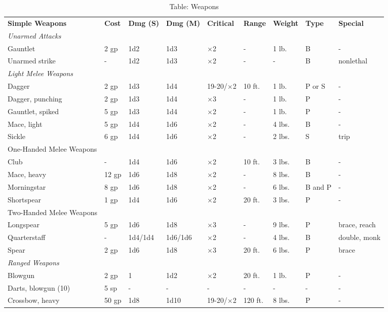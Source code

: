 \begin{table*}[]
\sffamily
\caption{Table: Weapons}
\begin{tabular}{lllllllll}
\textbf{Simple Weapons} & \textbf{Cost} & \textbf{Dmg (S)} & \textbf{Dmg (M)} & \textbf{Critical} & \textbf{Range} & \textbf{Weight} & \textbf{Type} & \textbf{Special}\\
\textit{Unarmed Attacks} \\
 Gauntlet & 2 gp & 1d2 & 1d3 & $\times$2 & - & 1 lb. & B & - \\
 Unarmed strike & - & 1d2 & 1d3 & $\times$2 & - & - & B & nonlethal \\
\textit{Light Melee Weapons} \\
 Dagger & 2 gp & 1d3 & 1d4 & 19-20/$\times$2 & 10 ft. & 1 lb. & P or S & - \\
 Dagger, punching & 2 gp & 1d3 & 1d4  & $\times$3 & - & 1 lb. & P & - \\
 Gauntlet, spiked & 5 gp & 1d3 & 1d4 & $\times$2 & - & 1 lb. & P & - \\
 Mace, light & 5 gp & 1d4 & 1d6 & $\times$2 & - & 4 lbs. & B & - \\
 Sickle & 6 gp & 1d4 & 1d6 & $\times$2 & - & 2 lbs. & S & trip \\
 One-Handed Melee Weapons \\
 Club & - & 1d4 & 1d6 & $\times$2 & 10 ft. & 3 lbs. & B & - \\
 Mace, heavy & 12 gp & 1d6 & 1d8 & $\times$2 & - & 8 lbs. & B & - \\
 Morningstar & 8 gp & 1d6 & 1d8 & $\times$2 & - & 6 lbs. & B and P & - \\
 Shortspear & 1 gp & 1d4 & 1d6 & $\times$2 & 20 ft. & 3 lbs. & P & - \\
 Two-Handed Melee Weapons \\
 Longspear & 5 gp & 1d6 & 1d8 & $\times$3 & - & 9 lbs. & P & brace, reach \\
 Quarterstaff & - & 1d4/1d4 & 1d6/1d6 & $\times$2 & - & 4 lbs. & B & double, monk \\
 Spear & 2 gp & 1d6 & 1d8 & $\times$3 & 20 ft. & 6 lbs. & P & brace \\
 \textit{Ranged Weapons} \\
 Blowgun & 2 gp & 1 & 1d2 & $\times$2 & 20 ft. & 1 lb. & P & - \\
 Darts, blowgun (10) & 5 sp & - & - & - & - & - & - & - \\
 Crossbow, heavy & 50 gp & 1d8 & 1d10 & 19-20/$\times$2 & 120 ft. & 8 lbs. & P & - \\

\end{tabular}
\end{table*}
